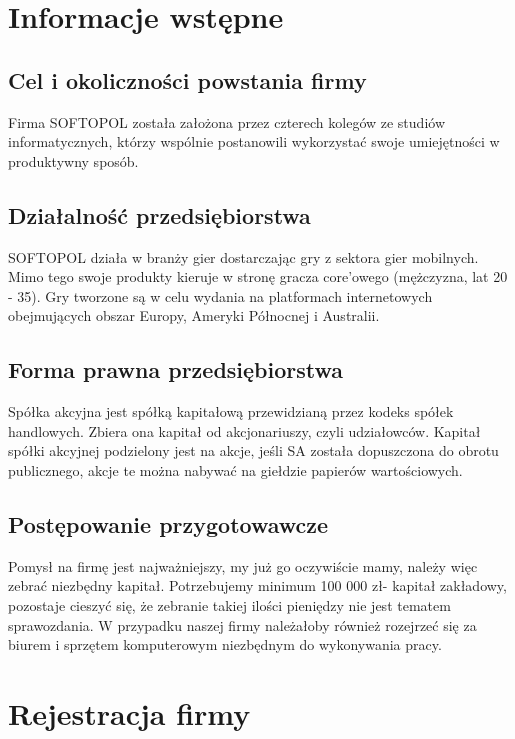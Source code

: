 \documentclass[11pt]{article}
\begin{document}
	\tableofcontents
	\cleardoublepage
	\setcounter{page}{2}
	
	
	\section{Informacje wstępne}
	
	\subsection{Cel i okoliczności powstania firmy}
		Firma SOFTOPOL została założona przez czterech kolegów ze studiów informatycznych, którzy wspólnie postanowili wykorzystać swoje umiejętności w produktywny sposób.
		
	\subsection{Działalność przedsiębiorstwa}
	
		SOFTOPOL działa w branży gier dostarczając gry z sektora gier mobilnych. Mimo tego swoje produkty kieruje w stronę gracza core'owego (mężczyzna, lat 20 - 35). Gry tworzone są w celu wydania na platformach internetowych obejmujących obszar Europy, Ameryki Północnej i Australii.
	
	\subsection{Forma prawna przedsiębiorstwa}
	
	Spółka akcyjna jest spółką kapitałową przewidzianą przez kodeks spółek handlowych. Zbiera ona kapitał od akcjonariuszy, czyli udziałowców.
Kapitał spółki akcyjnej podzielony jest na akcje, jeśli SA została dopuszczona do obrotu publicznego, akcje te można nabywać na giełdzie papierów wartościowych.

	\subsection{Postępowanie przygotowawcze}
	
	Pomysł na firmę jest najważniejszy, my już go oczywiście mamy, należy więc zebrać niezbędny kapitał.
	Potrzebujemy minimum 100 000 zł- kapitał zakładowy, pozostaje cieszyć się, że zebranie takiej ilości pieniędzy nie jest tematem sprawozdania. W przypadku naszej firmy należałoby również rozejrzeć się za biurem i sprzętem komputerowym niezbędnym do wykonywania pracy.
	
	\section{Rejestracja firmy}
\end{document}
